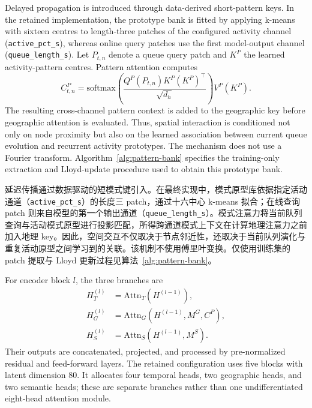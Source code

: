 \documentclass[a4paper,fleqn]{cas-dc}
\newcommand{\zhpara}[1]{%
  \par\begingroup\small\color{black!72}\noindent #1\par\endgroup}
\begin{document}
Delayed propagation is introduced through data-derived short-pattern keys. In the retained implementation, the prototype bank is fitted by applying k-means with sixteen centres to length-three patches of the configured activity channel (\texttt{active\_pct\_s}), whereas online query patches use the first model-output channel (\texttt{queue\_length\_s}). Let $P_{t,n}$ denote a queue query patch and $K^P$ the learned activity-pattern centres. Pattern attention computes
\begin{equation}
C^P_{t,n}=
\mathrm{softmax}\!\left(
\frac{Q^P(P_{t,n})K^P(K^P)^\top}{\sqrt{d_h}}
\right)V^P(K^P).
\end{equation}
The resulting cross-channel pattern context is added to the geographic key before geographic attention is evaluated. Thus, spatial interaction is conditioned not only on node proximity but also on the learned association between current queue evolution and recurrent activity prototypes. The mechanism does not use a Fourier transform. Algorithm~\ref{alg:pattern-bank} specifies the training-only extraction and Lloyd-update procedure used to obtain this prototype bank.

\zhpara{延迟传播通过数据驱动的短模式键引入。在最终实现中，模式原型库依据指定活动通道（\texttt{active\_pct\_s}）的长度三 patch，通过十六中心 k-means 拟合；在线查询 patch 则来自模型的第一个输出通道（\texttt{queue\_length\_s}）。模式注意力将当前队列查询与活动模式原型进行投影匹配，所得跨通道模式上下文在计算地理注意力之前加入地理 key。因此，空间交互不仅取决于节点邻近性，还取决于当前队列演化与重复活动原型之间学习到的关联。该机制不使用傅里叶变换。仅使用训练集的 patch 提取与 Lloyd 更新过程见算法~\ref{alg:pattern-bank}。}

For encoder block $l$, the three branches are
\begin{equation}
\begin{aligned}
H_T^{(l)}&=\mathrm{Attn}_T(H^{(l-1)}),\\
H_G^{(l)}&=\mathrm{Attn}_G(H^{(l-1)},M^G,C^P),\\
H_S^{(l)}&=\mathrm{Attn}_S(H^{(l-1)},M^S).
\end{aligned}
\end{equation}
Their outputs are concatenated, projected, and processed by pre-normalized residual and feed-forward layers. The retained configuration uses five blocks with latent dimension 80. It allocates four temporal heads, two geographic heads, and two semantic heads; these are separate branches rather than one undifferentiated eight-head attention module.
\end{document}
